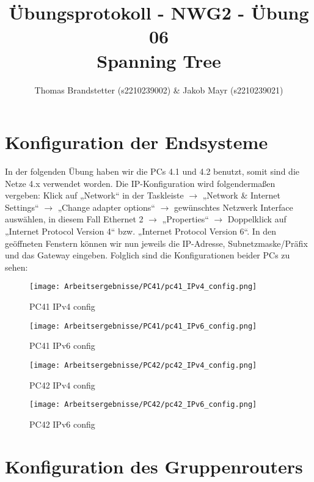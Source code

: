 \documentclass{article}
\title{Übungsprotokoll - NWG2 - Übung 06 \\ Spanning Tree}
\author{\vspace{0.5cm} Thomas Brandstetter (s2210239002) \& Jakob Mayr (s2210239021)}
\begin{document}
\maketitle

\section{Konfiguration der Endsysteme}

In der folgenden Übung haben wir die PCs 4.1 und 4.2 benutzt, somit sind die Netze 4.x verwendet worden. Die IP-Konfiguration wird folgendermaßen vergeben: Klick auf „Network“ in der Taskleiste $\rightarrow$ „Network \& Internet Settings“ $\rightarrow$ „Change adapter options“ $\rightarrow$ gewünschtes Netzwerk Interface auswählen, in diesem Fall Ethernet 2 $\rightarrow$ „Properties“ $\rightarrow$ Doppelklick auf „Internet Protocol Version 4“ bzw. „Internet Protocol Version 6“. In den geöffneten Fenstern können wir nun jeweils die IP-Adresse, Subnetzmaske/Präfix und das Gateway eingeben. Folglich sind die Konfigurationen beider PCs zu sehen:

\begin{figure}[!htp]
  \centering
  \begin{minipage}[b]{0.2\textwidth}
    \texttt{[image: Arbeitsergebnisse/PC41/pc41\_IPv4\_config.png]}
    \caption{PC41 IPv4 config}
  \end{minipage}
  \hspace{0.8cm}
  \begin{minipage}[b]{0.2\textwidth}
    \texttt{[image: Arbeitsergebnisse/PC41/pc41\_IPv6\_config.png]}
    \caption{PC41 IPv6 config}
  \end{minipage}
  \hspace{0.8cm}
  \begin{minipage}[b]{0.2\textwidth}
    \texttt{[image: Arbeitsergebnisse/PC42/pc42\_IPv4\_config.png]}
    \caption{PC42 IPv4 config}
  \end{minipage}
  \hspace{0.8cm}
  \begin{minipage}[b]{0.2\textwidth}
    \texttt{[image: Arbeitsergebnisse/PC42/pc42\_IPv6\_config.png]}
    \caption{PC42 IPv6 config}
  \end{minipage}
\end{figure}

\pagebreak



\section{Konfiguration des Gruppenrouters}
\end{document}
